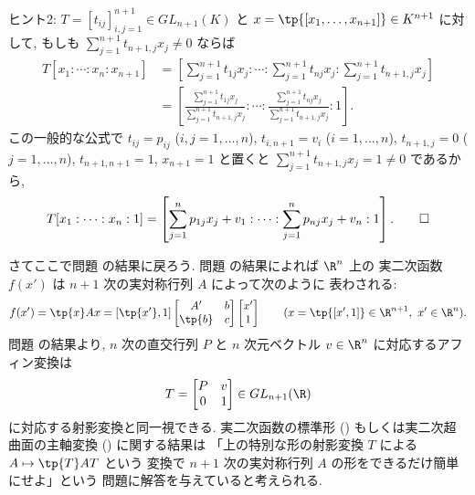 \documentclass[12pt,twoside]{jarticle}
\begin{document}
\medskip
\noindent
ヒント2: $T=[t_{ij}]_{i,j=1}^{n+1}\in GL_{n+1}(K)$ 
と $x=\tp{[x_1,\dots,x_{n+1}]}\in K^{n+1}$ に対して, 
もしも $\sum_{j=1}^{n+1}t_{n+1,j}x_j\ne 0$ ならば
\begin{align*}
  T[x_1:\cdots:x_n:x_{n+1}]
  &= 
  \left[
    \sum_{j=1}^{n+1}t_{1j}x_j
    : \cdots :
    \sum_{j=1}^{n+1}t_{nj}x_j
    :
    \sum_{j=1}^{n+1}t_{n+1,j}x_j
  \right]
  \\ &
  =
  \left[
    \frac{\sum_{j=1}^{n+1}t_{1j}x_j}{\sum_{j=1}^{n+1}t_{n+1,j}x_j}
    : \cdots :
    \frac{\sum_{j=1}^{n+1}t_{nj}x_j}{\sum_{j=1}^{n+1}t_{n+1,j}x_j}
    : 1
  \right].
\end{align*}
この一般的な公式で $t_{ij}=p_{ij}$ ($i,j=1,\dots,n$), 
$t_{i,n+1}=v_i$ ($i=1,\dots,n$),
$t_{n+1,j}=0$ ($j=1,\dots,n$), 
$t_{n+1,n+1}=1$,
$x_{n+1}=1$ と置くと $\sum_{j=1}^{n+1}t_{n+1,j}x_j= 1\ne 0$ であるから,
\begin{equation*}
  T[x_1:\cdots:x_n:1]
  = 
  \left[
    \sum_{j=1}^n p_{1j}x_j + v_1
    : \cdots :
    \sum_{j=1}^n p_{nj}x_j + v_n
    :
    1
  \right].
  \qed
\end{equation*}

\bigskip

さてここで問題  の結果に戻ろう.
問題  の結果によれば $\R^n$ 上の
実二次函数 $f(x')$ は $n+1$ 次の実対称行列 $A$ によって次のように
表わされる:
\begin{equation*}
  f(x') = \tp{x}Ax =
  [\tp{x'},1]
  \begin{bmatrix}
    A'     & b \\
    \tp{b} & c \\
  \end{bmatrix}
  \begin{bmatrix}
    x' \\
    1 \\
  \end{bmatrix}
  \qquad
  (x = \tp{[x',1]}\in \R^{n+1},\ x'\in \R^n).
\end{equation*}
問題  の結果より, $n$ 次の直交行列 $P$ 
と $n$ 次元ベクトル $v\in\R^n$ に対応するアフィン変換は
\begin{equation*}
  T = 
  \begin{bmatrix}
    P & v \\
    0 & 1 \\
  \end{bmatrix}
  \in GL_{n+1}(\R)
\end{equation*}
に対応する射影変換と同一視できる.  実二次函数の標準形 
() もしくは実二次超曲面の主軸変換 
() に関する結果は
「上の特別な形の射影変換 $T$ による $A\mapsto \tp{T}AT$ という
変換で $n+1$ 次の実対称行列 $A$ の形をできるだけ簡単にせよ」という
問題に解答を与えていると考えられる.
\end{document}
